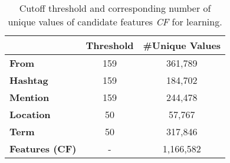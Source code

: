 \begin{table}[t!]
\centering
{\footnotesize
\begin{tabular}{|l|c|c|}
\hline
 & \textbf{Threshold} & \textbf{\#Unique Values} \\ \hline
\textbf{From} & 159 & 361,789 \\ \hline
\textbf{Hashtag} & 159 & 184,702 \\ \hline
\textbf{Mention} & 159 & 244,478 \\ \hline
\textbf{Location} & 50 & 57,767 \\ \hline
\textbf{Term} & 50 & 317,846 \\ \hline
\textbf{Features (CF)} & - & 1,166,582 \\ \hline
\end{tabular}
}
\caption{Cutoff threshold and corresponding number of unique values of candidate features \textit{CF} for learning.
}
\label{table:learningFeatures}
\end{table}


